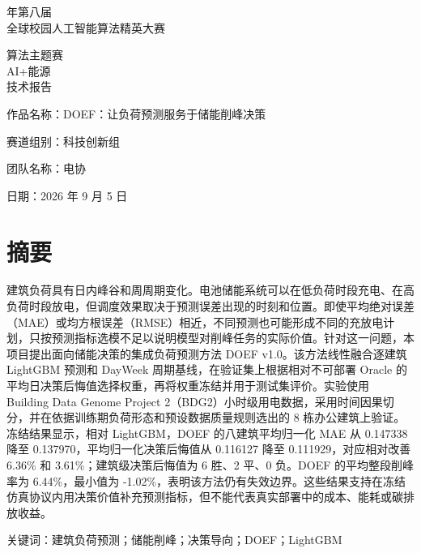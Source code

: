 \documentclass[12pt,a4paper]{article}
\begin{document}
\thispagestyle{fancy}
\vspace*{7mm}
\begin{center}
{\sffamily\fontsize{22}{30} 年第八届\\全球校园人工智能算法精英大赛\par}
\vspace{20mm}
{\sffamily\fontsize{22}{30}\selectfont 算法主题赛\\AI+能源\\技术报告\par}
\vspace{33mm}
\begin{minipage}{125mm}
\noindent 作品名称：DOEF：让负荷预测服务于储能削峰决策\par\vspace{6mm}
\noindent 赛道组别：科技创新组\par\vspace{6mm}
\noindent 团队名称：电协
\end{minipage}
\vfill
{\fontsize{16}{20}\selectfont 日期：2026 年 9 月 5 日}\vspace{24mm}
\end{center}
\clearpage

\section*{摘要}
建筑负荷具有日内峰谷和周周期变化。电池储能系统可以在低负荷时段充电、在高负荷时段放电，但调度效果取决于预测误差出现的时刻和位置。即使平均绝对误差（MAE）或均方根误差（RMSE）相近，不同预测也可能形成不同的充放电计划，只按预测指标选模不足以说明模型对削峰任务的实际价值。针对这一问题，本项目提出面向储能决策的集成负荷预测方法 DOEF v1.0。该方法线性融合逐建筑 LightGBM 预测和 DayWeek 周期基线，在验证集上根据相对不可部署 Oracle 的平均日决策后悔值选择权重，再将权重冻结并用于测试集评价。实验使用 Building Data Genome Project 2（BDG2）小时级用电数据，采用时间因果切分，并在依据训练期负荷形态和预设数据质量规则选出的 8 栋办公建筑上验证。冻结结果显示，相对 LightGBM，DOEF 的八建筑平均归一化 MAE 从 0.147338 降至 0.137970，平均归一化决策后悔值从 0.116127 降至 0.111929，对应相对改善 6.36\% 和 3.61\%；建筑级决策后悔值为 6 胜、2 平、0 负。DOEF 的平均整段削峰率为 6.44\%，最小值为 -1.02\%，表明该方法仍有失效边界。这些结果支持在冻结仿真协议内用决策价值补充预测指标，但不能代表真实部署中的成本、能耗或碳排放收益。\par
关键词：建筑负荷预测；储能削峰；决策导向；DOEF；LightGBM\par
\clearpage
\clearpage\tableofcontents\clearpage
\end{document}
